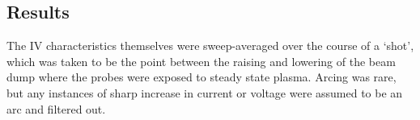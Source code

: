 \documentclass[a4paper, 12pt]{article} %
\begin{document}
\subsection{Results}
    The IV characteristics themselves were sweep-averaged over the course of a `shot', which was taken to be the point between the raising and lowering of the beam dump where the probes were exposed to steady state plasma. 
    Arcing was rare, but any instances of sharp increase in current or voltage were assumed to be an arc and filtered out. 
	
\end{document}

